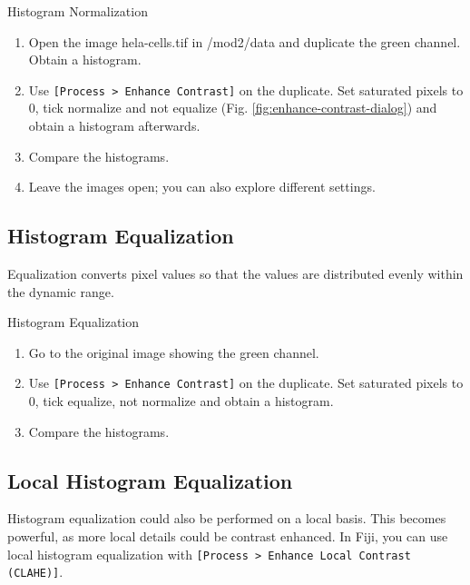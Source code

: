 \begin{taskbox}{Histogram Normalization}

\begin{enumerate}
	\item Open the image hela-cells.tif in /mod2/data and duplicate the green channel. Obtain a histogram.
	\item Use \texttt{[Process > Enhance Contrast]} on the duplicate. Set saturated pixels to 0, tick normalize and not equalize (Fig. \ref{fig:enhance-contrast-dialog}) and obtain a histogram afterwards.
	
	\begin{minipage}[t]{\linewidth}
		\begin{center}
		\medskip
		\label{fig:enhance-contrast-dialog}
		\end{center}
	\end{minipage}
	
	\item Compare the histograms. 
	\item Leave the images open; you can also explore different settings.
	
	\end{enumerate}
\end{taskbox}

\subsection{Histogram Equalization}
Equalization converts pixel values so that the values are distributed evenly within the dynamic range. 

\begin{taskbox}{Histogram Equalization}

\begin{enumerate}
	\item Go to the original image showing the green channel.
	\item Use \texttt{[Process > Enhance Contrast]} on the duplicate. Set saturated pixels to 0, tick equalize, not normalize and obtain a histogram.
	\item Compare the histograms. 
	
	\end{enumerate}
\end{taskbox}

\subsection{Local Histogram Equalization}
Histogram equalization could also be performed on a local basis. This becomes powerful, as more local details could be contrast enhanced. In Fiji, you can use local histogram equalization with \texttt{[Process > Enhance Local Contrast (CLAHE)]}.



